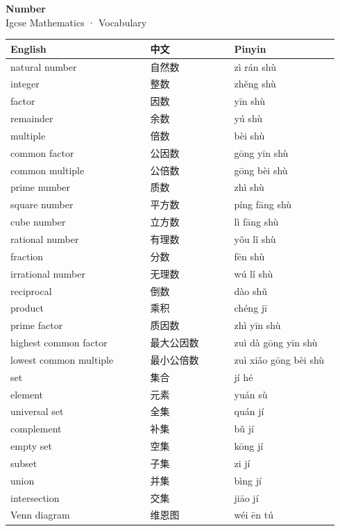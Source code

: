 \documentclass[11pt]{article}
\begin{document}
\begin{center}
  {\LARGE\bfseries Number}\\[0.35em]
  {\large Igcse Mathematics · Vocabulary}
\end{center}
\vspace{0.6em}

\begin{longtable}{@{}p{0.40\linewidth}p{0.24\linewidth}p{0.30\linewidth}@{}}
\toprule
\textbf{English} & \textbf{中文} & \textbf{Pinyin} \\
\midrule
\endhead
\bottomrule
\endlastfoot
natural number & 自然数 & zì rán shù \\
integer & 整数 & zhěng shù \\
factor & 因数 & yīn shù \\
remainder & 余数 & yú shù \\
multiple & 倍数 & bèi shù \\
common factor & 公因数 & gōng yīn shù \\
common multiple & 公倍数 & gōng bèi shù \\
prime number & 质数 & zhì shù \\
square number & 平方数 & píng fāng shù \\
cube number & 立方数 & lì fāng shù \\
rational number & 有理数 & yǒu lǐ shù \\
fraction & 分数 & fēn shù \\
irrational number & 无理数 & wú lǐ shù \\
reciprocal & 倒数 & dào shǔ \\
product & 乘积 & chéng jī \\
prime factor & 质因数 & zhì yīn shù \\
highest common factor & 最大公因数 & zuì dà gōng yīn shù \\
lowest common multiple & 最小公倍数 & zuì xiǎo gōng bèi shù \\
set & 集合 & jí hé \\
element & 元素 & yuán sù \\
universal set & 全集 & quán jí \\
complement & 补集 & bǔ jí \\
empty set & 空集 & kōng jí \\
subset & 子集 & zi jí \\
union & 并集 & bìng jí \\
intersection & 交集 & jiāo jí \\
Venn diagram & 维恩图 & wéi ēn tú \\

\end{longtable}
\end{document}
